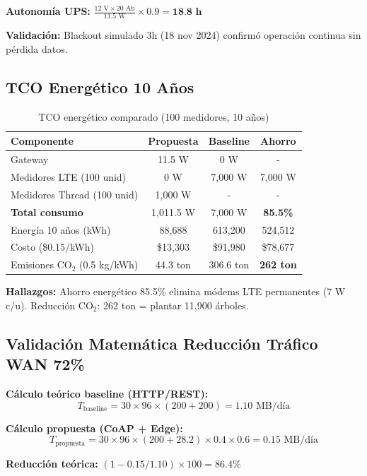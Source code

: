 \textbf{Autonomía UPS:} $\frac{12 \text{ V} \times 20 \text{ Ah}}{11.5 \text{ W}} \times 0.9 = \textbf{18.8 h}$

\textbf{Validación:} Blackout simulado 3h (18 nov 2024) confirmó operación continua sin pérdida datos.

\subsection{TCO Energético 10 Años}

\begin{table}[H]
\centering
\caption{TCO energético comparado (100 medidores, 10 años)}
\label{tab:tco-energetico}
\begin{tabular}{|l|c|c|c|}
\hline
\rowcolor{gray!20}
\textbf{Componente} & \textbf{Propuesta} & \textbf{Baseline} & \textbf{Ahorro} \\
\hline
Gateway & 11.5 W & 0 W & - \\
\hline
Medidores LTE (100 unid) & 0 W & 7,000 W & 7,000 W \\
\hline
Medidores Thread (100 unid) & 1,000 W & - & - \\
\hline
\textbf{Total consumo} & 1,011.5 W & 7,000 W & \textbf{85.5\%} \\
\hline
Energía 10 años (kWh) & 88,688 & 613,200 & 524,512 \\
\hline
Costo (\$0.15/kWh) & \$13,303 & \$91,980 & \$78,677 \\
\hline
Emisiones CO$_{2}$ (0.5 kg/kWh) & 44.3 ton & 306.6 ton & \textbf{262 ton} \\
\hline
\end{tabular}
\end{table}

\textbf{Hallazgos:} Ahorro energético 85.5\% elimina módems LTE permanentes (7 W c/u). Reducción CO$_{2}$: 262 ton = plantar 11,900 árboles.

\subsection{Validación Matemática Reducción Tráfico WAN 72\%}

\textbf{Cálculo teórico baseline (HTTP/REST):}
$$T_{\text{baseline}} = 30 \times 96 \times (200 + 200) = 1.10 \text{ MB/día}$$

\textbf{Cálculo propuesta (CoAP + Edge):}
$$T_{\text{propuesta}} = 30 \times 96 \times (200 + 28.2) \times 0.4 \times 0.6 = 0.15 \text{ MB/día}$$

\textbf{Reducción teórica:} $(1 - 0.15/1.10) \times 100 = 86.4\%$

